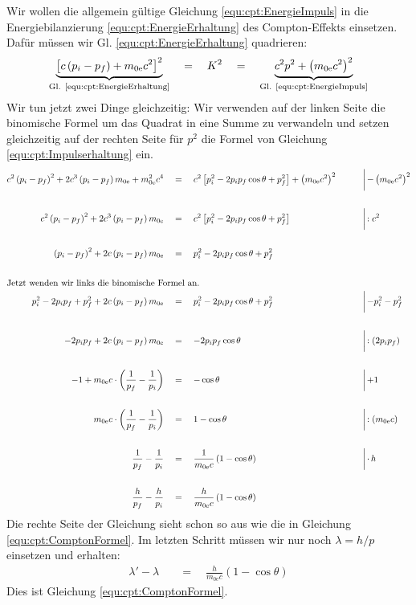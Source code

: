 \documentclass[a4paper, 10pt]{scrbook}
\newcommand\el{\text{e}}
\begin{document}
Wir wollen die allgemein gültige Gleichung \eqref{equ:cpt:EnergieImpuls} in die Energiebilanzierung \eqref{equ:cpt:EnergieErhaltung} des Compton-Effekts einsetzen.
Dafür müssen wir Gl. \eqref{equ:cpt:EnergieErhaltung} quadrieren:
\begin{align*}
 \underbrace{\left[ c\left(  p_i - p_f \right) + m_{0\el} c^2 \right]^2}_{\text{Gl. \ref{equ:cpt:EnergieErhaltung}}} \quad=\quad K^2 \quad=\quad \underbrace{ c^2 p^2 + \left( m_{0\el} c^2\right)^2}_{\text{Gl. \ref{equ:cpt:EnergieImpuls}}}
\end{align*}
Wir tun jetzt zwei Dinge gleichzeitig:
Wir verwenden auf der linken Seite die binomische Formel um das Quadrat in eine Summe zu verwandeln und setzen gleichzeitig auf der rechten Seite für $p^2$ die Formel von Gleichung \eqref{equ:cpt:Impulserhaltung} ein.
\begin{align*}
 c^2\left(  p_i - p_f \right)^2 + 2c^3\left(  p_i - p_f \right)m_{0\el} + m^2_{0\el} c^4 \quad&=\quad c^2 \left[ p_i^2 - 2p_i p_f \cos\theta + p_f^2 \right] + \left( m_{0\el} c^2\right)^2 \qquad &&\biggl|\, -\left( m_{0\el} c^2\right)^2\\~\\
 c^2\left(  p_i - p_f \right)^2 + 2c^3\left(  p_i - p_f \right)m_{0\el} \quad&=\quad c^2 \left[ p_i^2 - 2p_i p_f \cos\theta + p_f^2 \right] \qquad &&\biggl|\, :c^2\\~\\
 \left(  p_i - p_f \right)^2 + 2c\left(  p_i - p_f \right)m_{0\el} \quad&=\quad p_i^2 - 2p_i p_f \cos\theta + p_f^2\\~\\
\intertext{Jetzt wenden wir links die binomische Formel an.}
 p_i^2 - 2p_i p_f + p_f^2 + 2c\left(  p_i - p_f \right)m_{0\el} \quad&=\quad p_i^2 - 2p_i p_f \cos\theta + p_f^2 \qquad &&\biggl|\, -p_i^2 -p_f^2\\~\\
 - 2p_i p_f + 2c\left(  p_i - p_f \right)m_{0\el} \quad&=\quad - 2p_i p_f \cos\theta \qquad &&\biggl|\, :\left( 2p_i p_f \right)\\~\\
 -1 + m_{0\el}c\cdot \left( \frac{1}{p_f} - \frac{1}{p_i} \right)\quad&=\quad -\cos\theta&&\biggl|\, +1\\~\\
 m_{0\el}c\cdot \left( \frac{1}{p_f} - \frac{1}{p_i} \right)\quad&=\quad 1-\cos\theta&&\biggl|\, :(m_{0\el}c)\\~\\
 \frac{1}{p_f} - \frac{1}{p_i}\quad&=\quad \frac{1}{m_{0\el}c} \left( 1-\cos\theta \right)&&\biggl|\, \cdot\, h\\~\\
 \frac{h}{p_f} - \frac{h}{p_i}\quad&=\quad \frac{h}{m_{0\el}c} \left( 1-\cos\theta \right)
\end{align*}
Die rechte Seite der Gleichung sieht schon so aus wie die in Gleichung \eqref{equ:cpt:ComptonFormel}.
Im letzten Schritt müssen wir nur noch $\lambda = h/p$ einsetzen und erhalten:
\begin{align*}
 \lambda' - \lambda \quad&=\quad \frac{h}{m_{0\el}c} \left( 1-\cos\theta \right)
\end{align*}
Dies ist Gleichung \eqref{equ:cpt:ComptonFormel}.
\end{document}
